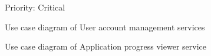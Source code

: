 \documentclass[12pt]{article}
\begin{document}
\begin{figure}[H]
\centering	
{}
\caption{Use case diagram of User account management services}
Priority: Critical
\end{figure}

\begin{figure}[H]
\centering	
{}
\caption{Use case diagram of Application progress viewer service}
\end{figure}
\end{document}
